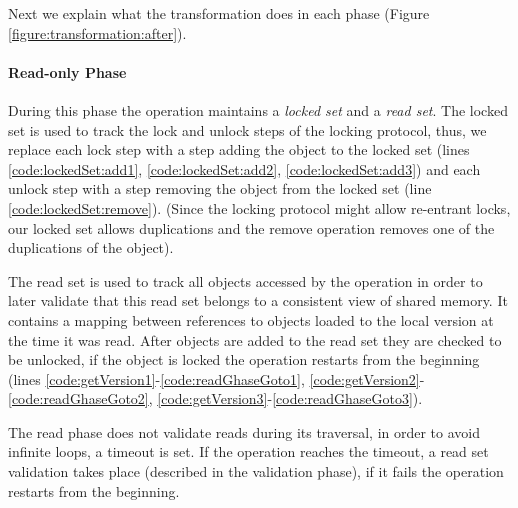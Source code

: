 Next we explain what the transformation does in each phase (Figure
\ref{figure:transformation:after}). 

\paragraph{Read-only Phase} 
  During this phase the operation maintains a \emph{locked set}
  and a \emph{read set}. 
  The locked set is used to track the lock and unlock steps
  of the locking protocol, thus, we replace each lock step 
  with a step adding the object to the locked set 
  (lines
  \ref{code:lockedSet:add1},
  \ref{code:lockedSet:add2},
  \ref{code:lockedSet:add3})
  and each unlock step with a step removing the object 
  from the locked set (line \ref{code:lockedSet:remove}). 
  (Since the locking protocol might allow re-entrant locks, 
  our locked set allows duplications and the remove 
  operation removes one of the duplications of the object).
  
The read set is used to track all objects accessed by the 
operation in order to later validate that this read set
belongs to a consistent view of shared memory.  
It contains a mapping between references to objects loaded 
to the local version at the time it was read. After 
objects are added to the read set they are checked to be 
unlocked, if the object is locked the operation restarts
from the beginning (lines 
\ref{code:getVersion1}-\ref{code:readGhaseGoto1},
\ref{code:getVersion2}-\ref{code:readGhaseGoto2},
\ref{code:getVersion3}-\ref{code:readGhaseGoto3}). 


 
The read phase does not validate reads during its traversal, 
in order to avoid infinite loops, a timeout is set. 
If the operation reaches the timeout, a read set 
validation takes place (described in the validation phase), 
if it fails the operation restarts from the beginning.
  

